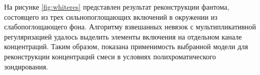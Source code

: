 На рисунке \ref{fig:whiteres} представлен результат реконструкции фантома, состоящего из трех сильнопоглощающих включений в окружении из слабопоглощающего фона.
Алгоритму взвешанных невязок с мультипликативной регуляризацией удалось выделить элементы включения на отдельном канале концентраций.
Таким образом, показана применимость выбранной модели для реконструкции концентраций смеси в условиях полихроматического зондирования.

